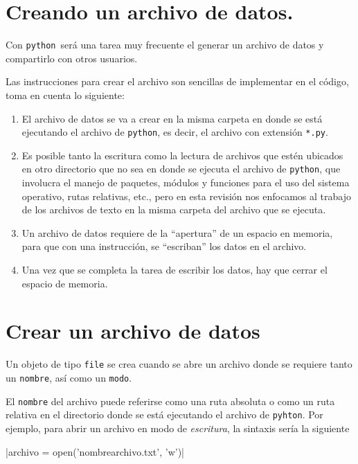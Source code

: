 \documentclass[12pt]{article}
\newcommand{\python}{\texttt{python}}
\begin{document}
\section{Creando un archivo de datos.}
Con \python\ será una tarea muy frecuente el generar un archivo de datos y compartirlo con otros usuarios.
\par
Las instrucciones para crear el archivo son sencillas de implementar en el código, toma en cuenta lo siguiente:
\begin{enumerate}
\item El archivo de datos se va a crear en la misma carpeta en donde se está ejecutando el archivo de \python, es decir, el archivo con extensión \texttt{*.py}.
\item Es posible tanto la escritura como la lectura de archivos que estén ubicados en otro directorio que no sea en donde se ejecuta el archivo de \python, que involucra el manejo de paquetes, módulos y funciones para el uso del sistema operativo, rutas relativas, etc., pero en esta revisión nos enfocamos al trabajo de los archivos de texto en la misma carpeta del archivo que se ejecuta.
\item Un archivo de datos requiere de la \enquote{apertura} de un espacio en memoria, para que con una instrucción, se \enquote{escriban} los datos en el archivo.
\item Una vez que se completa la tarea de escribir los datos, hay que cerrar el espacio de memoria.
\end{enumerate}
\newpage
\section{Crear un archivo de datos}
Un objeto de tipo \texttt{file} se crea cuando se abre un archivo donde se requiere tanto un \texttt{nombre}, así como un \texttt{modo}.
\par
El \texttt{nombre} del archivo puede referirse como una ruta absoluta o como un ruta relativa en el directorio donde se está ejecutando el archivo de \texttt{pyhton}. Por ejemplo, para abrir un archivo en modo de \emph{escritura}, la sintaxis sería la siguiente

|archivo = open('nombrearchivo.txt', 'w')|
\end{document}
